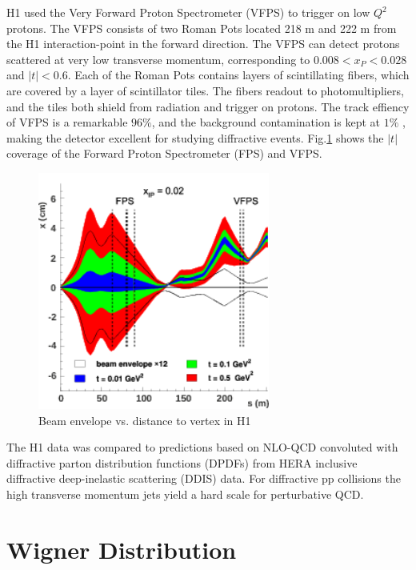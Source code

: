 H1 used the Very Forward Proton Spectrometer (VFPS) to trigger on low $Q^2$ protons. The VFPS consists of two Roman Pots located 218 m and 222 m from the H1 interaction-point in the forward direction. The VFPS can detect protons scattered at very low transverse momentum, corresponding to $0.008 < x_{P} < 0.028$ and $|t|<0.6$. Each of the Roman Pots contains layers of scintillating fibers, which are covered by a layer of scintillator tiles. The fibers readout to photomultipliers, and the tiles both shield from radiation and trigger on protons. The track effiency of VFPS is a remarkable $96 \%$, and the background contamination is kept at $1 \%$ , making the detector excellent for studying diffractive events. Fig.\ref{fig:h1BeamEnv} shows the $|t|$ coverage of the Forward Proton Spectrometer (FPS) and VFPS.

\begin{figure}[h!]
\begin{centering}
\includegraphics[width=3in]{Chapter2/importfigs/fig7_h1_2015.png}
\par\end{centering}
\caption{Beam envelope vs. distance to vertex in H1 \label{fig:h1BeamEnv}}
\end{figure}

The H1 data was compared to predictions based on NLO-QCD convoluted with diffractive parton distribution functions (DPDFs) from HERA inclusive diffractive deep-inelastic scattering (DDIS) data. For diffractive pp collisions the high transverse momentum jets yield a hard scale for perturbative QCD. 

\section{Wigner Distribution}

